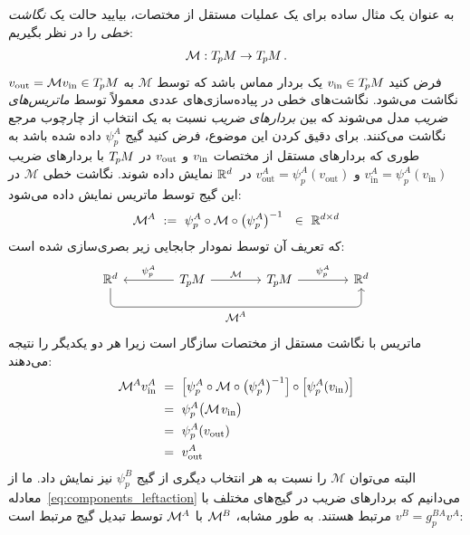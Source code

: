 به عنوان یک مثال ساده برای یک عملیات مستقل از مختصات، بیایید حالت یک \emph{نگاشت خطی} را در نظر بگیریم:
\begin{align}
	\mathcal{M}:T_{\mkern-1.5mu p}\mkern-.5muM\to T_{\mkern-1.5mu p}\mkern-.5muM \,.
\end{align}
فرض کنید $v_\text{in}\in T_{\mkern-1.5mu p}\mkern-.5muM$ یک بردار مماس باشد که توسط $\mathcal{M}$ به $v_\text{out} = \mathcal{M} v_\text{in} \in T_{\mkern-1.5mu p}\mkern-.5muM$ نگاشت می‌شود.
نگاشت‌های خطی در پیاده‌سازی‌های عددی معمولاً توسط \emph{ماتریس‌های ضریب} مدل می‌شوند که بین \emph{بردارهای ضریب} نسبت به یک انتخاب از چارچوب مرجع نگاشت می‌کنند.
برای دقیق کردن این موضوع، فرض کنید گیج $\psi_p^A$ داده شده باشد به طوری که بردارهای مستقل از مختصات $v_\textup{in}$ و $v_\textup{out}$ در $T_{\mkern-1.5mu p}\mkern-.5muM$ با بردارهای ضریب $v_\text{in}^A=\psi_p^A(v_\text{in})$ و $v_\text{out}^A=\psi_p^A(v_\text{out})$ در~$\mathbb{R}^d$ نمایش داده شوند.
نگاشت خطی $\mathcal{M}$ در این گیج توسط ماتریس نمایش داده می‌شود:
\begin{align}\label{eq:matrix_trivialization}
	\MAA\ :=\ \psi_p^A \circ \mathcal{M} \circ \big(\psi_p^A\big)^{-1} \ \ \in\ \R^{d\times d}
\end{align}
که تعریف آن توسط نمودار جابجایی زیر بصری‌سازی شده است:
\begin{equation}\label{eq:bundle_morphism_onexone}
	\begin{tikzcd}[row sep=4.em, column sep=4.em]
		\R^d
		\arrow[rrr, pos=.5, rounded corners, to path={
			-- ([yshift=-3.5ex]\tikztostart.south)
			--node[below]{\small$
				\MAA
				$} ([yshift=-3.5ex]\tikztotarget.south)
			-- (\tikztotarget.south)
		}]
		& \TpM  \arrow[r, "\mathcal{M}"]
		\arrow[l, "\psi_p^A"']
		& \TpM  \arrow[r, "\psi_p^A"]
		& \R^d
	\end{tikzcd}
\end{equation}
ماتریس با نگاشت مستقل از مختصات سازگار است زیرا هر دو یکدیگر را نتیجه می‌دهند:
\begin{align}
	\MAA v^A_\text{in}
	\ &=\ \pig[ \psi_p^A \circ \mathcal{M} \circ \big(\psi_p^A\big)^{-1} \pig] \circ \pig[ \psi_p^A(v_\text{in}) \pig] \notag \\
	\ &=\ \psi_p^A \big( \mathcal{M}\mkern2mu v_\text{in} \big) \notag \\
	\ &=\ \psi_p^A (v_\text{out}) \notag \\
	\ &=\ v_\text{out}^A
\end{align}
البته می‌توان $\mathcal{M}$ را نسبت به هر انتخاب دیگری از گیج $\psi_p^B$ نیز نمایش داد.
ما از معادله~\eqref{eq:components_leftaction} می‌دانیم که بردارهای ضریب در گیج‌های مختلف با $v^B = g_p^{BA} v^A$ مرتبط هستند.
به طور مشابه، $\mathcal{M}^{\mkern-1mu B}$ با $\mathcal{M}^{\mkern-1mu A}$ توسط تبدیل گیج مرتبط است:

